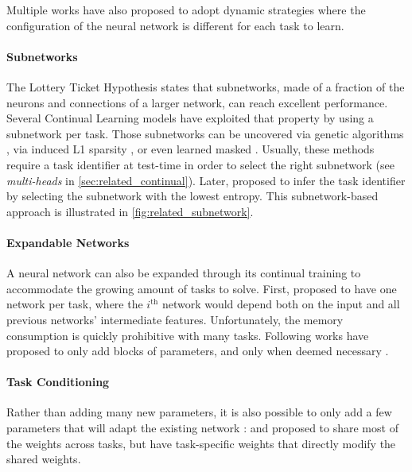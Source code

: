 Multiple works have also proposed to adopt dynamic strategies where the configuration of the neural
network is different for each task to learn.

\paragraph{Subnetworks} The Lottery Ticket Hypothesis \citep{frankle2019lottery_ticket} states that
subnetworks, made of a fraction of the neurons and connections of a larger network, can reach
excellent performance. Several Continual Learning models have exploited that property by using a
subnetwork per task. Those subnetworks can be uncovered via genetic algorithms
\citep{fernando2017path_net}, via induced L1 sparsity \citep{golkar2019neural_pruning}, or even
learned masked \cite{serra2018hat,hung2019cpg}. Usually, these methods require a task identifier at
test-time in order to select the right subnetwork (see \textit{multi-heads} in
\autoref{sec:related_continual}). Later, \cite{wortsman2020supermasks} proposed to infer the task
identifier by selecting the subnetwork with the lowest entropy. This subnetwork-based approach is
illustrated in \autoref{fig:related_subnetwork}.

\paragraph{Expandable Networks} A neural network can also be expanded through its continual
training to accommodate the growing amount of tasks to solve. First, \cite{rusu2016progressive}
proposed to have one network per task, where the $i^{\text{th}}$ network would depend both on the
input and all previous networks' intermediate features. Unfortunately, the memory consumption is
quickly prohibitive with many tasks. Following works have proposed to only add blocks of parameters,
and only when deemed necessary
\citep{hung2019cpg,veniat2021mntdp,ostapenko2021localmodulecomposition}.

\paragraph{Task Conditioning} Rather than adding many new parameters, it is also possible to only add
a few parameters that will adapt the existing network \citep{rebuffi2017visualadapters}:
\cite{wen2020batchensemble} and \cite{sun2019metatransfer} proposed to share most of the weights
across tasks, but have task-specific weights that directly modify the shared weights.

